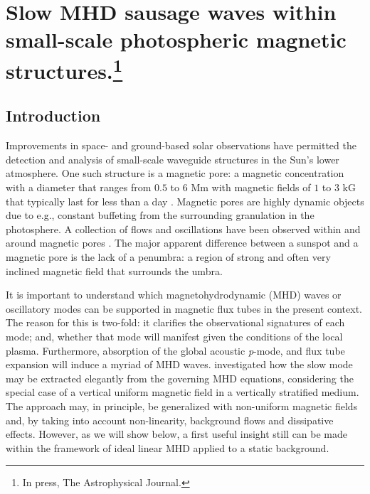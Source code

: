 \graphicspath{{Chapter4/Figs/}}

\chapter[Slow MHD sausage waves]{Slow MHD sausage waves within small-scale photospheric magnetic structures.\footnote{In press, The Astrophysical Journal.}}
\label{chapter4}

   \vspace*{\fill}\par
   \pagebreak

\section{Introduction}
\label{Intro}
    
    Improvements in space- and ground-based solar observations have permitted the detection and analysis of small-scale waveguide structures in the Sun's lower atmosphere.
    One such structure is a magnetic pore: a magnetic concentration with a diameter that ranges from $0.5$ to $6$ Mm with magnetic fields of $1$ to $3$ kG that typically last for less than a day \citep{1970SoPh...13...85S}.
    Magnetic pores are highly dynamic objects due to e.g., constant buffeting from the surrounding granulation in the photosphere.
    A collection of flows and oscillations have been observed within and around magnetic pores \citep{1999SoPh..187..389B,2002A&A...383..275H,2002A&A...395..249R,doretalb,SAO,Dorotovic2014,freij2014,jess2015multiwavelength,2015A&A...579A..73M}.
    The major apparent difference between a sunspot and a magnetic pore is the lack of a penumbra: a region of strong and often very inclined magnetic field that surrounds the umbra. 
    
    It is important to understand which magnetohydrodynamic (MHD) waves or oscillatory modes can be supported in magnetic flux tubes in the present context.
    The reason for this is two-fold: it clarifies the observational signatures of each mode; and, whether that mode will manifest given the conditions of the local plasma. 
    Furthermore, absorption of the global acoustic \textit{p}-mode, and flux tube expansion will induce a myriad of MHD waves.	
    \citet{roberts} investigated how the slow mode may be extracted elegantly from the governing MHD equations, considering the special case of a vertical uniform magnetic field in a vertically stratified medium.
    The approach may, in principle, be generalized with non-uniform magnetic fields \citep{luna-cardozo} and, by taking into account non-linearity, background flows and dissipative effects.
    However, as we will show below, a first useful insight still can be made within the framework of ideal linear MHD applied to a static background.
    
